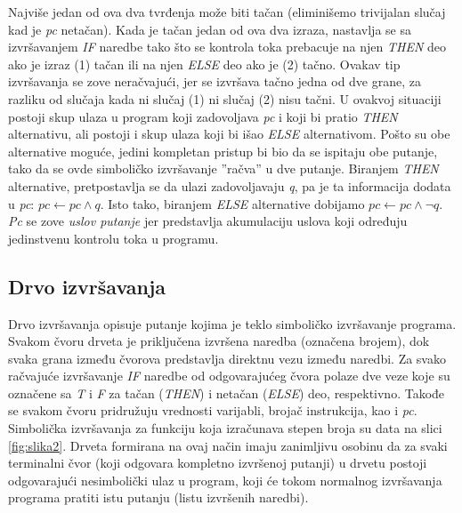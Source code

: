\documentclass[a4paper]{article}
\begin{document}
Najviše jedan od ova dva tvrđenja može biti tačan (eliminišemo trivijalan slučaj kad je \textit{pc} netačan). Kada je tačan jedan od ova dva izraza, nastavlja se sa izvršavanjem \textit{IF} naredbe tako što se kontrola toka prebacuje na njen \textit{THEN} deo ako je izraz (1) tačan ili na njen \textit{ELSE} deo ako je (2) tačno. Ovakav tip izvršavanja se zove neračvajući, jer se izvršava tačno jedna od dve grane, za razliku od slučaja kada ni slučaj (1) ni slučaj (2) nisu tačni. U ovakvoj situaciji postoji skup ulaza u program koji zadovoljava \textit{pc} i koji bi pratio \textit{THEN} alternativu, ali postoji i skup ulaza koji bi išao \textit{ELSE} alternativom. Pošto su obe alternative moguće, jedini kompletan pristup bi bio da se ispitaju obe putanje, tako da se ovde simboličko izvršavanje ''račva'' u dve putanje. Biranjem \textit{THEN} alternative, pretpostavlja se da ulazi zadovoljavaju \textit{q}, pa je ta informacija dodata u \textit{pc}: $ pc \gets pc \wedge q $. Isto tako, biranjem \textit{ELSE} alternative dobijamo $ pc \gets pc \wedge \neg q $. \textit{Pc} se zove \textit{uslov putanje} jer predstavlja akumulaciju uslova koji određuju jedinstvenu kontrolu toka u programu.

\subsection{Drvo izvršavanja}
\label{subsec:podnaslov1}
Drvo izvršavanja opisuje putanje kojima je teklo simboličko izvršavanje programa. Svakom čvoru drveta je priključena izvršena naredba (označena brojem), dok svaka grana između čvorova predstavlja direktnu vezu između naredbi. Za svako račvajuće izvršavanje \textit{IF} naredbe od odgovarajućeg čvora polaze dve veze koje su označene sa \textit{T} i \textit{F} za tačan (\textit{THEN}) i netačan (\textit{ELSE}) deo, respektivno. Takođe se svakom čvoru pridružuju vrednosti varijabli, brojač instrukcija, kao i \textit {pc}. Simbolička izvršavanja za funkciju koja izračunava stepen broja su data na slici \ref{fig:slika2}. Drveta formirana na ovaj način imaju zanimljivu osobinu da za svaki terminalni čvor (koji odgovara kompletno izvršenoj putanji) u drvetu postoji odgovarajući nesimbolički ulaz u program, koji će tokom normalnog izvršavanja programa pratiti istu putanju (listu izvršenih naredbi).
\end{document}
